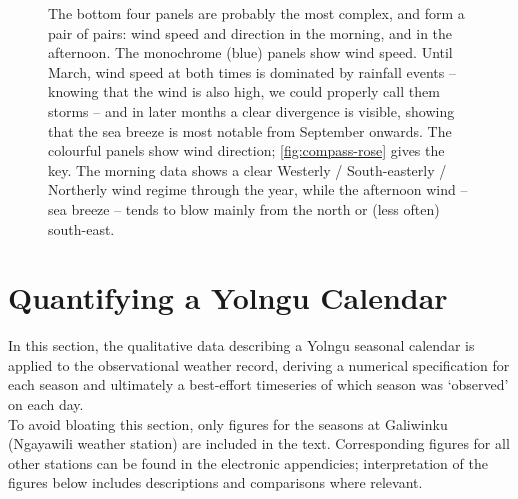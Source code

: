 \begin{figure}[p]
\begin{framed}
    The bottom four panels are probably the most complex, and form a pair of
    pairs: wind speed and direction in the morning, and in the afternoon.
    The monochrome (blue) panels show wind speed.  Until March, wind speed at
    both times is dominated by rainfall events -- knowing that the wind is also
    high, we could properly call them storms -- and in later months a clear
    divergence is visible, showing that the sea breeze is most notable from
    September onwards.
    The colourful panels show wind direction; \cref{fig:compass-rose} gives
    the key.  The morning data shows a clear Westerly / South-easterly / Northerly
    wind regime through the year, while the afternoon wind -- sea breeze --
    tends to blow mainly from the north or (less often) south-east.
\end{framed}
\end{figure}

\checkoddpage\ifoddpage\else\ObservationMultipanels\fi


\section{Quantifying a Yolngu Calendar}

In this section, the qualitative data describing a Yolngu seasonal
calendar is applied to the observational weather record, deriving
a numerical specification for each season and ultimately a best-effort
timeseries of which season was `observed' on each day.\\

To avoid bloating this section, only figures for the seasons at Galiwinku
(Ngayawili weather station) are included in the text.  Corresponding
figures for all other stations can be found in the electronic appendicies;
interpretation of the figures below includes descriptions and comparisons
where relevant.

